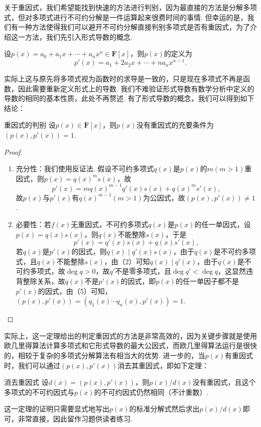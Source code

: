 关于重因式，我们希望能找到快速的方法进行判别，因为最直接的方法是分解多项式，但对多项式进行不可约分解是一件运算起来很费时间的事情. 但幸运的是，我们有一种方法使得我们可以避开不可约分解直接判别多项式是否有重因式，为了介绍这一方法，我们先引入形式导数的概念.
\begin{definition}{}{}
    设$p(x)=a_0+a_1x+\cdots+a_nx^n\in\mathbf{F}[x]$，则$p(x)$的定义为
    \[p'(x)=a_1+2a_2x+\cdots+na_nx^{n-1}.\]
\end{definition}
实际上这与原先将多项式视为函数时的求导是一致的，只是现在多项式不再是函数，因此需要重新定义形式上的导数. 我们不难验证形式导数有数学分析中定义的导数的相同的基本性质，此处不再赘述. 有了形式导数的概念，我们可以得到如下结论：
\begin{theorem}{}{重因式的判别}
    设$p(x)\in\mathbf{F}[x]$，则$p(x)$没有重因式的充要条件为$(p(x),p'(x))=1$.
\end{theorem}
\begin{proof}
    \begin{enumerate}
        \item 充分性：我们使用反证法. 假设不可约多项式$q(x)$是$p(x)$的$m(m>1)$重因式，则$p(x)=q(x)^ms(x)$，故
              \[p'(x)=mq(x)^{m-1}q'(x)s(x)+q(x)^ms'(x),\]
              故$p(x)$与$p'(x)$有$q(x)^{m-1}(m>1)$为公因式，故$(p(x),p'(x))\neq 1$.
        \item 必要性：若$f(x)$无重因式，不可约多项式$q(x)$是$p(x)$的任一单因式，设$p(x)=q(x)s(x)$，则$q(x)$不能整除$s(x)$，于是
              \[p'(x)=q'(x)s(x)+q(x)s'(x),\]
              若$q(x)$是$p'(x)$的因式，则$q(x)\mid q'(x)s(x)$，由于$q(x)$是不可约多项式，且$q(x)$不能整除$s(x)$，由（2）可知$q(x)\mid q'(x)$，由于$q(x)$是不可约多项式，故$\deg q>0$，故$q'$不是零多项式，且$\deg q'<\deg q$，这显然违背整除关系，故$q(x)$不是$p'(x)$的因式，即$p(x)$的任一单因子都不是$p'(x)$的因式，由（5）可知，$(p(x),p'(x))=(q_1(x)\cdots q_n(x),p'(x))=1$.
    \end{enumerate}
\end{proof}

实际上，这一定理给出的判定重因式的方法是非常高效的，因为关键步骤就是使用欧几里得算法计算多项式和它形式导数的最大公因式，而欧几里得算法运行是很快的，相较于复杂的多项式分解算法有相当大的优势. 进一步的，当$p(x)$有重因式时，我们可以通过$(p(x),p'(x))$消去其重因式，即如下定理：
\begin{theorem}{}{消去重因式}
    设$d(x)=(p(x),p'(x))$，则$p(x)/d(x)$没有重因式，且这个多项式的不可约因式与$p(x)$的不可约因式仍然相同（不计重数）.
\end{theorem}
这一定理的证明只需要显式地写出$p(x)$的标准分解式然后求出$p(x)/d(x)$即可，非常直接，因此留作习题供读者练习.

